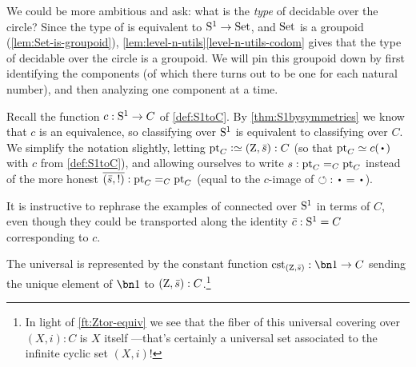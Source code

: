 We could be more ambitious and ask: what is the \emph{type} of decidable
\coverings over the circle?  Since the type of \coverings is
equivalent to ${\mathrm{S}^1}\to \mathrm{Set}$, and $\mathrm{Set}$ is a groupoid
(\cref{lem:Set-is-groupoid}),
\cref{lem:level-n-utils}\ref{level-n-utils-codom} gives
that the type of decidable \coverings over the circle is a groupoid.
We will pin this groupoid down by first identifying the components
(of which there turns out to be one for each natural number),
and then analyzing one component at a time.

Recall the function $c:{\mathrm{S}^1}\to C$ of \cref{def:S1toC}.
By \cref{thm:S1bysymmetries} we know that $c$ is an equivalence,
so classifying \coverings over ${\mathrm{S}^1}$ is equivalent to
classifying \coverings over $C$.
We simplify the notation slightly, letting $\pt_C\defeq(\zet,\etop{s}):C$
(so that $\pt_C \jdeq c(\base)$ with $c$ from \cref{def:S1toC}),
and allowing ourselves to write $s:\mathrm{pt}_C=_C\mathrm{pt}_C$ instead of the
more honest $\overline{({\bar {s}},{!})}:\mathrm{pt}_C=_C\mathrm{pt}_C$
(equal to the $c$-image of ${\Sloop}:\base=\base$).

It is instructive to rephrase the examples of connected \coverings over ${\mathrm{S}^1}$ in
terms of $C$, even though they could be transported along the identity $\bar c:{\mathrm{S}^1}=C$ corresponding to $c$.

\begin{example}\label{exa:univCcover}
The universal \covering is represented by the constant function
$\cst{(\zet,\etop{s})}:\bn 1\to C$ sending the unique element
of $\bn 1$ to $(\mathrm{Z},\bar {s}):C$.\footnote{%
  In light of \cref{ft:Ztor-equiv} we see that the fiber
  of this universal covering over $(X,i):C$ is $X$ itself%
  ---that's certainly a universal set associated to the
  infinite cyclic set $(X,i)$!}
\end{example}

